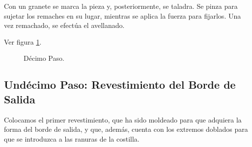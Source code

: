 Con un granete se marca la pieza y, posteriormente, se taladra. Se pinza para sujetar los remaches en su lugar, mientras se aplica la fuerza para fijarlos. Una vez remachado, se efectúa el avellanado.

Ver figura \ref{fig:dec}.

\begin{figure}[!htb]
\centering
{}
\caption{Décimo Paso. \label{fig:dec}}
\end{figure}

\pagebreak
\subsection{Undécimo Paso: Revestimiento del Borde de Salida}
Colocamos el primer revestimiento, que ha sido moldeado para que adquiera la forma del borde de salida, y que, además, cuenta con los extremos doblados para que se introduzca a las ranuras de la costilla.

